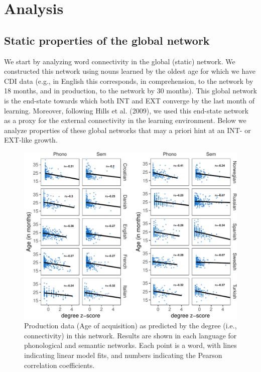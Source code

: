 \documentclass[english,,man,floatsintext]{apa6}
\begin{document}
\hypertarget{analysis}{%
\section{Analysis}\label{analysis}}

\hypertarget{static-properties-of-the-global-network}{%
\subsection{Static properties of the global network}\label{static-properties-of-the-global-network}}

We start by analyzing word connectivity in the global (static) network. We constructed this network using nouns learned by the oldest age for which we have CDI data (e.g., in English this corresponds, in comprehension, to the network by 18 months, and in production, to the network by 30 months). This global network is the end-state towards which both INT and EXT converge by the last month of learning. Moreover, following Hills et al. (2009), we used this end-state network as a proxy for the external connectivity in the learning environment. Below we analyze properties of these global networks that may a priori hint at an INT- or EXT-like growth.

\begin{figure}[!h]
\includegraphics[width=\textwidth]{ms_files/figure-latex/corrProd-1} \caption{Production data (Age of acquisition) as predicted by the degree (i.e., connectivity) in this network. Results are shown in each language for phonological and semantic networks. Each point is a word, with lines indicating linear model fits, and numbers indicating the Pearson correlation coefficients.}\label{fig:corrProd}
\end{figure}
\end{document}
